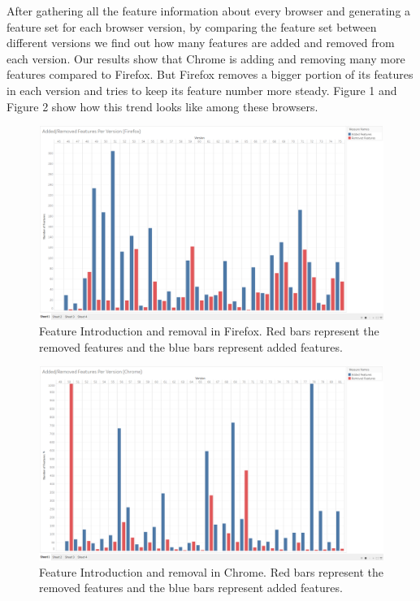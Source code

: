 After gathering all the feature information about every browser and generating a feature set for each browser version, by comparing the feature set between different versions we find out how many features are added and removed from each version. Our results show that Chrome is adding and removing many more features compared to Firefox. But Firefox removes a bigger portion of its features in each version and tries to keep its feature number more steady. Figure 1 and Figure 2 show how this trend looks like among these browsers.

\begin{figure}[ht]
    \centering
    \includegraphics[width=\columnwidth]{figures/Firefox-add-remove.png}
    \caption{Feature Introduction and removal in Firefox. Red bars represent the removed features and the blue bars represent added features.}
    \label{fig:times_bar}
\end{figure}

\begin{figure}[ht]
    \centering
    \includegraphics[width=\columnwidth]{figures/Chrome-add-remove.png}
    \caption{Feature Introduction and removal in Chrome. Red bars represent the removed features and the blue bars represent added features.}
    \label{fig:times_bar}
\end{figure}

